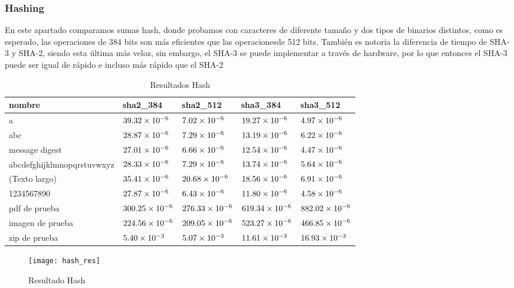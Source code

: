 \documentclass[../main.tex]{subfiles}
\begin{document}
\newpage{}

\subsubsection{Hashing}\label{sec:hash}
En este apartado comparamos sumas hash, donde probamos con caracteres de diferente tamaño
y dos tipos de binarios distintos, como es esperado, las operaciones de 384 bits son más eficientes
que las operacionesde 512 bits. También es notoria la diferencia de tiempo de SHA-3 y SHA-2, siendo esta
última más veloz, sin embargo, el SHA-3 se puede implementar a través de hardware, por lo que
entonces el SHA-3 puede ser igual de rápido e incluso más rápido que el SHA-2
\begin{table*}[]
  \centering
  \caption{Resultados Hash}\label{tab:hash-res}
  \begin{tabular}{|m{2cm}<{\centering}|m{2cm}<{\centering}|m{2cm}<{\centering}|m{2cm}<{\centering}|m{2cm}<{\centering}|}
    \hline
    \rowcolor[HTML]{000000}
    {\color[HTML]{FFFFFF} nombre} & {\color[HTML]{FFFFFF} sha2\_384} & {\color[HTML]{FFFFFF} sha2\_512} & {\color[HTML]{FFFFFF} sha3\_384} & {\color[HTML]{FFFFFF} sha3\_512} \\ \hline
    a                          & $\num{39.32E-06}$  & $\num{7.02E-06 }$  & $\num{19.27E-06}$  & $\num{4.97E-06}$   \\ \hline
    \rowcolor[HTML]{C0C0C0}
    abc                        & $\num{28.87E-06}$  & $\num{7.29E-06 }$  & $\num{13.19E-06}$  & $\num{6.22E-06}$   \\ \hline
    message digest             & $\num{27.01E-06}$  & $\num{6.66E-06 }$  & $\num{12.54E-06}$  & $\num{4.47E-06}$   \\ \hline
    \rowcolor[HTML]{C0C0C0}
    abcdefghijklmnopqrstuvwxyz & $\num{28.33E-06}$  & $\num{7.29E-06 }$  & $\num{13.74E-06}$  & $\num{5.64E-06}$   \\ \hline
    (Texto largo)              & $\num{35.41E-06}$  & $\num{20.68E-06}$  & $\num{18.56E-06}$  & $\num{6.91E-06}$   \\ \hline
    \rowcolor[HTML]{C0C0C0}
    1234567890                 & $\num{27.87E-06}$  & $\num{6.43E-06 }$  & $\num{11.80E-06}$  & $\num{4.58E-06}$   \\ \hline
    pdf de prueba              & $\num{300.25E-06}$ & $\num{276.33E-06}$ & $\num{619.34E-06}$ & $\num{882.02E-06}$ \\ \hline
    \rowcolor[HTML]{C0C0C0}
    imagen de prueba           & $\num{224.56E-06}$ & $\num{209.05E-06}$ & $\num{523.27E-06}$ & $\num{466.85E-06}$ \\ \hline
    zip de prueba              & $\num{5.40E-03 }$  & $\num{5.07E-03 }$  & $\num{11.61E-03}$  & $\num{16.93E-03}$  \\ \hline
  \end{tabular}
\end{table*}
\begin{figure}
  \centering
  \texttt{[image: hash\_res]}
  \caption{Resultado Hash}\label{fig:hash}
\end{figure}
\end{document}
